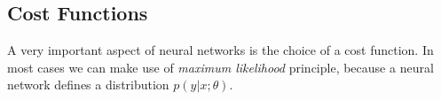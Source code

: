 \subsection{Cost Functions}
A very important aspect of neural networks is the choice of a cost function.
In most cases we can make use of \emph{maximum likelihood} principle, because a neural network defines a distribution \(p(y \vert x ; \theta)\).
